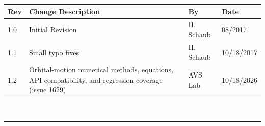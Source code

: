 \documentclass[]{BasiliskReportMemo}
\begin{document}
\makeCover

%
%
\pagestyle{empty}
{\renewcommand{\arraystretch}{1.25}
\noindent
\begin{longtable}{|p{0.5in}|p{3.3in}|p{1.07in}|p{0.9in}|}
\hline
{\bfseries Rev} & {\bfseries Change Description} & {\bfseries By}& {\bfseries Date} \\
\hline
1.0 & Initial Revision & H. Schaub & 08/2017\\
1.1 & Small typo fixes & H. Schaub & 10/18/2017\\
1.2 & Orbital-motion numerical methods, equations, API compatibility, and regression coverage (issue 1629) & AVS Lab & 10/18/2026\\
\hline

\end{longtable}
}



\newpage
\setcounter{page}{1}
\pagestyle{fancy}

\tableofcontents %
~\\ \hrule ~\\ %











\end{document}
